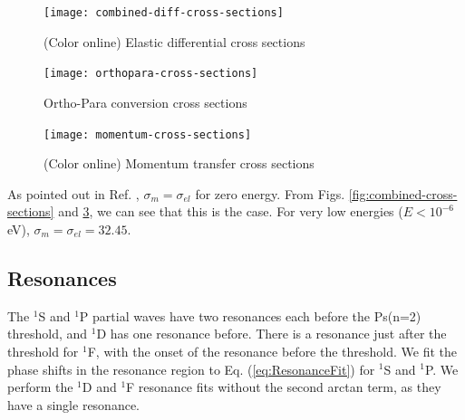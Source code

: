 \documentclass[preprint,showpacs,preprintnumbers,amsmath,amssymb]{revtex4}
\begin{document}
\begin{figure}[H]
	\centering
	\texttt{[image: combined-diff-cross-sections]}
	\caption{(Color online) Elastic differential cross sections}
	\label{fig:combined-diff-cross-sections}
\end{figure}

\begin{figure}[H]
	\centering
	\texttt{[image: orthopara-cross-sections]}
	\caption{Ortho-Para conversion cross sections}
	\label{fig:orthopara-cross-sections}
\end{figure}

\begin{figure}[H]
	\centering
	\texttt{[image: momentum-cross-sections]}
	\caption{(Color online) Momentum transfer cross sections}
	\label{fig:momentum-cross-sections}
\end{figure}

As pointed out in Ref. \cite{Buckman1989}, $\sigma_m = \sigma_{el}$ for zero energy. From Figs. \ref{fig:combined-cross-sections} and \ref{fig:momentum-cross-sections}, we can see that this is the case. For very low energies ($E < 10^{-6}$ eV), $\sigma_m = \sigma_{el} = 32.45$.








\subsection{Resonances}

The $^1$S and $^1$P partial waves have two resonances each before the Ps(n=2) threshold, and $^1$D has one resonance before. There is a resonance just after the threshold for $^1$F, with the onset of the resonance before the threshold. We fit the phase shifts in the resonance region to Eq. (\ref{eq:ResonanceFit}) for $^1$S and $^1$P. We perform the $^1$D and $^1$F resonance fits without the second arctan term, as they have a single resonance.
\end{document}
